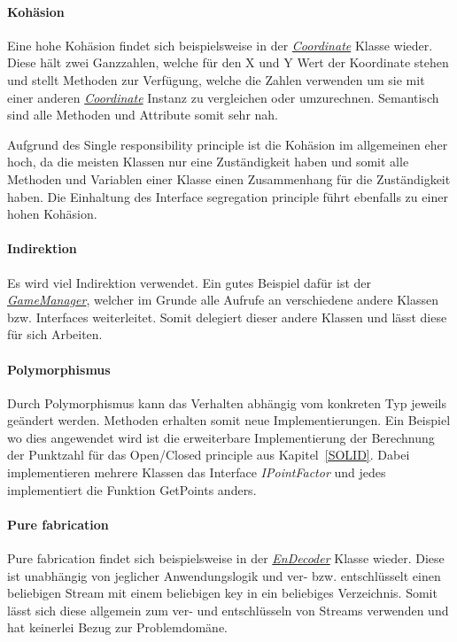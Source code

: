 \paragraph{Kohäsion}
Eine hohe Kohäsion findet sich beispielsweise in der \href{https://github.com/EinToni/Wortfinder/blob/main/Wortfinder/Coordinate.cs}{\textit{Coordinate}} Klasse wieder. Diese hält zwei Ganzzahlen, welche für den X und Y Wert der Koordinate stehen und stellt Methoden zur Verfügung, welche die Zahlen verwenden um sie mit einer anderen \href{https://github.com/EinToni/Wortfinder/blob/main/Wortfinder/Coordinate.cs}{\textit{Coordinate}} Instanz zu vergleichen oder umzurechnen. Semantisch sind alle Methoden und Attribute somit sehr nah.


Aufgrund des Single responsibility principle ist die Kohäsion im allgemeinen eher hoch, da die meisten Klassen nur eine Zuständigkeit haben und somit alle Methoden und Variablen einer Klasse einen Zusammenhang für die Zuständigkeit haben. Die Einhaltung des Interface segregation principle führt ebenfalls zu einer hohen Kohäsion.

\paragraph{Indirektion}
Es wird viel Indirektion verwendet. Ein gutes Beispiel dafür ist der \href{https://github.com/EinToni/Wortfinder/blob/main/Wortfinder/GameManager.cs}{\textit{GameManager}}, welcher im Grunde alle Aufrufe an verschiedene andere Klassen bzw. Interfaces weiterleitet. Somit delegiert dieser andere Klassen und lässt diese für sich Arbeiten.

\paragraph{Polymorphismus}
Durch Polymorphismus kann das Verhalten abhängig vom konkreten Typ jeweils geändert werden. Methoden erhalten somit neue Implementierungen. Ein Beispiel wo dies angewendet wird ist die erweiterbare Implementierung  der Berechnung der Punktzahl für das Open/Closed principle aus Kapitel~\ref{SOLID}. Dabei implementieren mehrere Klassen das Interface \textit{IPointFactor} und jedes implementiert die Funktion \glqq GetPoints\grqq{} anders.

\paragraph{Pure fabrication}
Pure fabrication findet sich beispielsweise in der \href{https://github.com/EinToni/Wortfinder/blob/main/Wortfinder/EnDecrypter.cs}{\textit{EnDecoder}} Klasse wieder. Diese ist unabhängig von jeglicher Anwendungslogik und ver- bzw. entschlüsselt einen beliebigen Stream mit einem beliebigen key in ein beliebiges Verzeichnis. Somit lässt sich diese allgemein zum ver- und entschlüsseln von Streams verwenden und hat keinerlei Bezug zur Problemdomäne.

